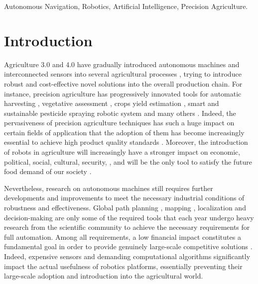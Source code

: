\documentclass[journal]{IEEEtran}
\begin{document}
\begin{IEEEkeywords}
Autonomous Navigation, Robotics, Artificial Intelligence, Precision Agriculture.
\end{IEEEkeywords}

%
\IEEEpeerreviewmaketitle


\section{Introduction}
\label{sec:intro}
Agriculture 3.0 and 4.0 have gradually introduced autonomous machines and interconnected sensors into several agricultural processes \cite{mazzia2021deepway, salvetti2022waypoint}, trying to introduce robust and cost-effective novel solutions into the overall production chain. For instance, precision agriculture has progressively innovated tools for automatic harvesting \cite{roldan2018robots}, vegetative assessment \cite{zhang2020assessment}, crops yield estimation \cite{feng2020yield}, smart and sustainable pesticide spraying robotic system \cite{deshmukh2020design} and many others \cite{khaliq2019refining, radoglou2020compilation}. Indeed, the pervasiveness of precision agriculture techniques has such a huge impact on certain fields of application that the adoption of them has become increasingly essential to achieve high product quality standards \cite{comba2015vineyard}. Moreover, the introduction of robots in agriculture will increasingly have a stronger impact on economic, political, social, cultural, security, \cite{sparrow2021robots}, and will be the only tool to satisfy the future food demand of our society \cite{duckett2018agricultural}.

Nevertheless, research on autonomous machines still requires further developments and improvements to meet the necessary industrial conditions of robustness and effectiveness. Global path planning \cite{mazzia2021deepway, salvetti2022waypoint},  mapping \cite{garg2021semantics}, localization \cite{saeedi2018navigating} and decision-making \cite{mota2020commonsense} are only some of the required tools that each year undergo heavy research from the scientific community to achieve the necessary requirements for full automation. Among all requirements, a low financial impact constitutes a fundamental goal in order to provide genuinely large-scale competitive solutions \cite{levoir2020high}. Indeed, expensive sensors and demanding computational algorithms significantly impact the actual usefulness of robotics platforms, essentially preventing their large-scale adoption and introduction into the agricultural world. 
\end{document}
